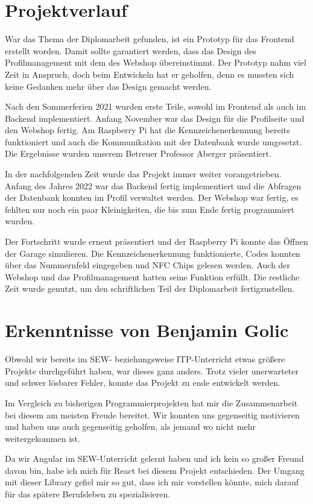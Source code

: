 \section{Projektverlauf}
War das Thema der Diplomarbeit gefunden, ist ein Prototyp für das Frontend erstellt worden. Damit sollte garantiert werden, dass das Design des Profilmanagement mit dem des Webshop übereinstimmt. Der Prototyp nahm viel Zeit in Anspruch, doch beim Entwickeln hat er geholfen, denn es mussten sich keine Gedanken mehr über das Design gemacht werden.

Nach den Sommerferien 2021 wurden erste Teile, sowohl im Frontend als auch im Backend implementiert. Anfang November war das Design für die Profilseite und den Webshop fertig. Am Raspberry Pi hat die Kennzeichenerkennung bereits funktioniert und auch die Kommunikation mit der Datenbank wurde umgesetzt. Die Ergebnisse wurden unserem Betreuer Professor Aberger präsentiert.

In der nachfolgenden Zeit wurde das Projekt immer weiter vorangetrieben.  Anfang des Jahres 2022 war das Backend fertig implementiert und die Abfragen der Datenbank konnten im Profil verwaltet werden. Der Webshop war fertig, es fehlten nur noch ein paar Kleinigkeiten, die bis zum Ende fertig programmiert wurden. 

Der Fortschritt wurde erneut präsentiert und der Raspberry Pi konnte das Öffnen der Garage simulieren. Die Kennzeichenerkennung funktionierte, Codes konnten über das Nummernfeld eingegeben und NFC Chips gelesen werden. Auch der Webshop und das Profilmanagement hatten seine Funktion erfüllt. Die restliche Zeit wurde genutzt, um den schriftlichen Teil der Diplomarbeit fertigzustellen. 


\section{Erkenntnisse von Benjamin Golic}
Obwohl wir bereits im SEW- beziehungsweise ITP-Unterricht etwas größere Projekte durchgeführt haben, war dieses ganz anders. Trotz vieler unerwarteter und schwer lösbarer Fehler, konnte das Projekt zu ende entwickelt werden. 

Im Vergleich zu bisherigen Programmierprojekten hat mir die Zusammenarbeit bei diesem am meisten Freude bereitet. Wir konnten uns gegenseitig motivieren und haben uns auch gegenseitig geholfen, als jemand wo nicht mehr weitergekommen ist. 

Da wir Angular im SEW-Unterricht gelernt haben und ich kein so großer Freund davon bin, habe ich mich für React bei diesem Projekt entschieden. Der Umgang mit dieser Library gefiel mir so gut, dass ich mir vorstellen könnte, mich darauf für das spätere Berufsleben zu spezialisieren. 

